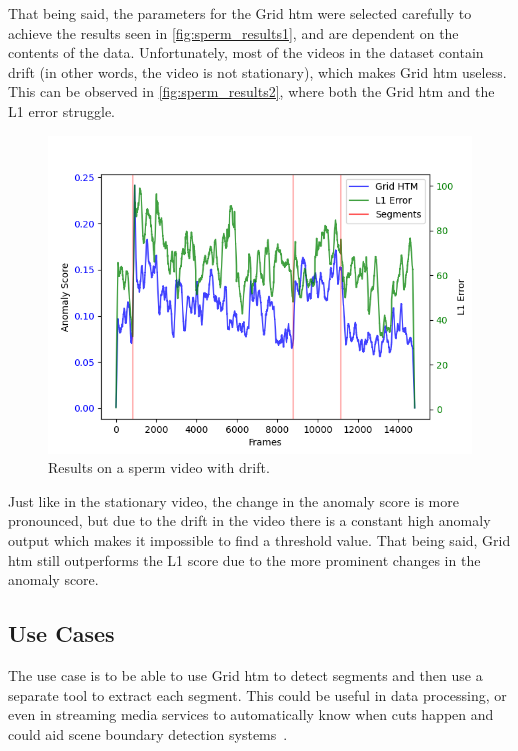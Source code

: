 \par
That being said, the parameters for the Grid \gls*{htm} were selected carefully to achieve the results seen in \autoref{fig:sperm_results1}, and are dependent on the contents of the data. Unfortunately, most of the videos in the dataset contain drift (in other words, the video is not stationary), which makes Grid \gls*{htm} useless. This can be observed in \autoref{fig:sperm_results2}, where both the Grid \gls*{htm} and the L1 error struggle.
\begin{figure}[H]
    \centering
    \includegraphics[width=\textwidth]{resources/experiments/sperm/sperm_result2.png}
    \caption[Drifting Video Results]{Results on a sperm video with drift.}
    \label{fig:sperm_results2}
\end{figure}
Just like in the stationary video, the change in the anomaly score is more pronounced, but due to the drift in the video there is a constant high anomaly output which makes it impossible to find a threshold value. That being said, Grid \gls*{htm} still outperforms the L1 score due to the more prominent changes in the anomaly score.
\subsection{Use Cases}
The use case is to be able to use Grid \gls*{htm} to detect segments and then use a separate tool to extract each segment. This could be useful in data processing, or even in streaming media services to automatically know when cuts happen and could aid scene boundary detection systems~\cite{scene_boundary_detection}.
